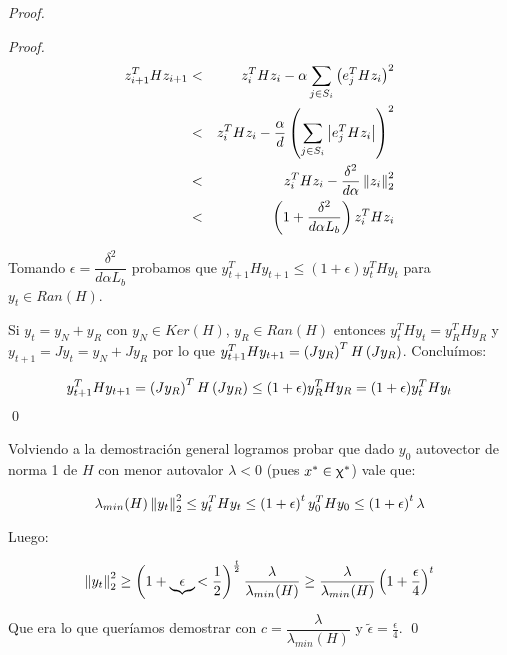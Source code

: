 \begin{proof}
\begin{proof}
		\begin{equation*}
		\begin{aligned}
			z_{i+1}^THz_{i+1} & < & z_i^T H z_i -  \alpha \sum\limits_{j \in S_i}{\left(e_j^T H z_i\right)^2} \\
			& < &  z_i^T H z_i -  \frac{\alpha}{d} \left(\sum\limits_{j \in S_i}{\left\lvert e_j^T H z_i\right\rvert}\right)^2 \\
			& < &  z_i^T H z_i -  \dfrac{\delta^2}{d\alpha} \left\lVert z_i\right\rVert_2^2\\
			& < &  \left(1 +  \dfrac{\delta^2}{d\alpha L_b}\right)z_i^T H z_i
		\end{aligned}
		\end{equation*}
		
		Tomando $\epsilon = \dfrac{\delta^2}{d\alpha L_b}$ probamos que $y_{t+1}^THy_{t+1} \leq (1+\epsilon) y_{t}^THy_{t} $ para $y_t \in Ran(H)$.
		
		Si $y_t = y_N + y_R$ con $y_N \in Ker(H)$, $y_R \in Ran(H)$ entonces $y_{t}^THy_{t} = y_{R}^THy_{R}$ y $y_{t+1} = Jy_t = y_N + Jy_R$ por lo que $y_{t+1}^THy_{t+1} = \left(Jy_{R}\right)^TH\left(Jy_{R}\right)$. Conclu\'imos:
		
		\begin{equation*}
			y_{t+1}^THy_{t+1} = \left(Jy_{R}\right)^TH\left(Jy_{R}\right) \leq (1+\epsilon) y_{R}^THy_{R} = (1+\epsilon) y_{t}^THy_{t}
		\end{equation*}
		\qed
	\end{proof}

	Volviendo a la demostraci\'on general logramos probar que dado $y_0$ autovector de norma 1 de $H$ con menor autovalor $\lambda < 0$ (pues $x^* \in \upchi^*$) vale que:
	
	\begin{equation*}
		\lambda_{min}(H) \left\lVert y_t\right\rVert_2^2 \leq y_{t}^THy_{t} \leq \left(1+ \epsilon\right)^t y_{0}^THy_{0} \leq \left(1+ \epsilon\right)^t\lambda
	\end{equation*}

	Luego:
	
	\begin{equation*}
		\left\lVert y_t\right\rVert_2^2 \geq \left(1+ \underbrace{\epsilon}{< \frac{1}{2}}\right)^{\frac{t}{2}}{\dfrac{\lambda}{\lambda_{min}(H)}} \geq {\dfrac{\lambda}{\lambda_{min}(H)}}\left(1 + \frac{\epsilon}{4}\right)^t
	\end{equation*}
	
	Que era lo que quer\'iamos demostrar con $c = \dfrac{\lambda}{\lambda_{min}(H)}$ y $\tilde{\epsilon} = \frac{\epsilon}{4}$. \qed

\end{proof}

